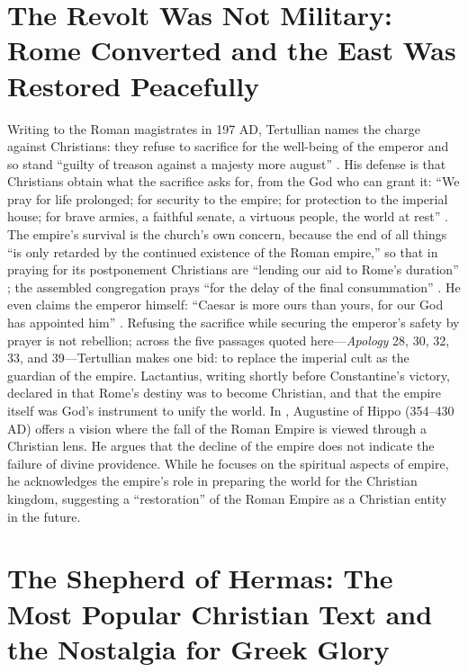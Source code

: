 \section{The Revolt Was Not Military: Rome Converted and the East Was Restored Peacefully}\label{sec:the-revolt-is-not-militaristic-rome-chose-to-spiritually-convert-to-christianity-and-the-eastern-roman-empire-was-restored-peacefully-while-the-christian-writers-started-to-praise-rome.}

Writing to the Roman magistrates in 197 AD, Tertullian names the charge against Christians: they refuse to sacrifice for the well-being of the emperor and so stand ``guilty of treason against a majesty more august'' \cite[28]{tertullian:apology}.
His defense is that Christians obtain what the sacrifice asks for, from the God who can grant it: ``We pray for life prolonged; for security to the empire; for protection to the imperial house; for brave armies, a faithful senate, a virtuous people, the world at rest'' \cite[30]{tertullian:apology}.
The empire's survival is the church's own concern, because the end of all things ``is only retarded by the continued existence of the Roman empire,'' so that in praying for its postponement Christians are ``lending our aid to Rome's duration'' \cite[32]{tertullian:apology}; the assembled congregation prays ``for the delay of the final consummation'' \cite[39]{tertullian:apology}.
He even claims the emperor himself: ``Caesar is more ours than yours, for our God has appointed him'' \cite[33]{tertullian:apology}.
Refusing the sacrifice while securing the emperor's safety by prayer is not rebellion; across the five passages quoted here---\emph{Apology} 28, 30, 32, 33, and 39---Tertullian makes one bid: to replace the imperial cult as the guardian of the empire.
Lactantius, writing shortly before Constantine's victory, declared in \cite[7.15]{lactantius:institutes} that Rome's destiny was to become Christian, and that the empire itself was God’s instrument to unify the world.
In \cite{augustine:civdei}, Augustine of Hippo (354--430 AD) offers a vision where the fall of the Roman Empire is viewed through a Christian lens.
He argues that the decline of the empire does not indicate the failure of divine providence.
While he focuses on the spiritual aspects of empire, he acknowledges the empire's role in preparing the world for the Christian kingdom, suggesting a ``restoration'' of the Roman Empire as a Christian entity in the future.

\section{The Shepherd of Hermas: The Most Popular Christian Text and the Nostalgia for Greek Glory}\label{sec:the-shepherd-of-hermas-c.-100-160-ad}

